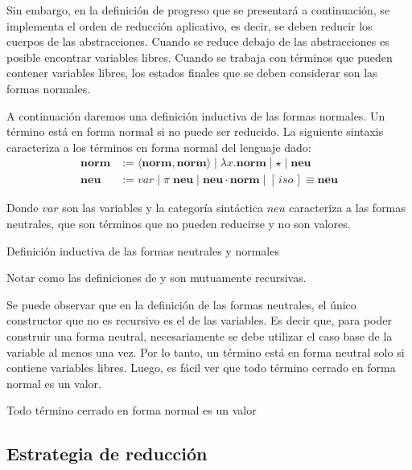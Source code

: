 Sin embargo, en la definición de progreso que se presentará a continuación, se implementa el orden de reducción aplicativo, es decir, se deben reducir los cuerpos de las abstracciones.
Cuando se reduce debajo de las abstracciones es posible encontrar variables libres.
Cuando se trabaja con términos que pueden contener variables libres, los estados finales que se deben considerar son las formas normales.

A continuación daremos una definición inductiva de las formas normales. Un término está en forma normal si no puede ser reducido. La siguiente sintaxis caracteriza a los términos en forma normal del lenguaje dado: 
\begin{align*}
	\textbf{norm} &:= \langle \textbf{norm}, \textbf{norm} \rangle \mid \lambda x. \textbf{norm} \mid \star \mid \textbf{neu} \\
	\textbf{neu} &:= var \mid \pi\; \textbf{neu} \mid \textbf{neu} \cdot \textbf{norm} \mid [\, iso \,]\!\!\equiv \textbf{neu}
\end{align*}

Donde $var$ son las variables y la categoría sintáctica $neu$ caracteriza a las formas neutrales, que son términos que no pueden reducirse y no son valores.

\begin{codigo}
	Definición inductiva de las formas neutrales y normales
\end{codigo}

Notar como las definiciones de \type{$\Uparrow$} y \type{$\Downarrow$} son mutuamente recursivas.

Se puede observar que en la definición de las formas neutrales, el único constructor que no es recursivo es el de las variables.
Es decir que, para poder construir una forma neutral, necesariamente se debe utilizar el caso base de la variable al menos una vez.
Por lo tanto, un término está en forma neutral solo si contiene variables libres.
Luego, es fácil ver que todo término cerrado en forma normal es un valor.

\begin{codigo}
	Todo término cerrado en forma normal es un valor
\end{codigo}

\subsection{Estrategia de reducción}

